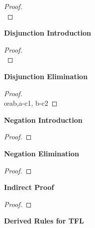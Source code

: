 \newpage
\begin{multicols}{2}
\begin{proof}
\\	
	 
\end{proof}


\vspace{1em}\noindent\textbf{Disjunction Introduction}

\begin{proof}

\\	
\end{proof}

\vspace{1em}\noindent\textbf{Disjunction Elimination}

\begin{proof}
\\	\open
	\close
	\open
	\close
	 \oe{ab,a-c1, b-c2}
\end{proof}

\vspace{1em}\noindent\textbf{Negation Introduction}

\begin{proof}
	\open
	\close
\end{proof}


\vspace{1em}\noindent\textbf{Negation Elimination}

\begin{proof}
\end{proof}

\vspace{1em}\noindent\textbf{Indirect Proof}

\begin{proof}
	\open
	\close
\end{proof}

\end{multicols}

\vspace{1em}
\begin{center}
\textbf{\Large Derived Rules for TFL}
\end{center}


